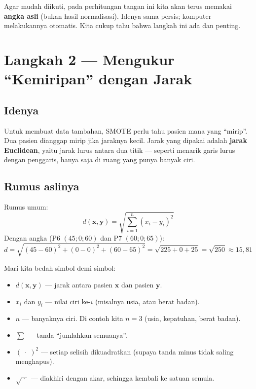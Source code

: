 \documentclass[11pt,a4paper]{article}
\begin{document}
\begin{catatan}
Agar mudah diikuti, pada perhitungan tangan ini kita akan terus memakai \textbf{angka asli}
(bukan hasil normalisasi). Idenya sama persis; komputer melakukannya otomatis. Kita cukup tahu
bahwa langkah ini ada dan penting.
\end{catatan}

\section{Langkah 2 --- Mengukur ``Kemiripan'' dengan Jarak}

\subsection{Idenya}

Untuk membuat data tambahan, SMOTE perlu tahu pasien mana yang ``mirip''. Dua pasien dianggap
mirip jika jaraknya kecil. Jarak yang dipakai adalah \textbf{jarak Euclidean}, yaitu jarak
lurus antara dua titik --- seperti menarik garis lurus dengan penggaris, hanya saja di ruang
yang punya banyak ciri.

\subsection{Rumus aslinya}

\begin{rumus}
Rumus umum:
\[ d(\mathbf{x}, \mathbf{y}) = \sqrt{\sum_{i=1}^{n} (x_i - y_i)^2} \]
Dengan angka (P6 $(45;0;60)$ dan P7 $(60;0;65)$):
\[ d = \sqrt{(45-60)^2 + (0-0)^2 + (60-65)^2} = \sqrt{225 + 0 + 25} = \sqrt{250} \approx 15{,}81 \]
\end{rumus}

\noindent Mari kita bedah simbol demi simbol:
\begin{itemize}[leftmargin=*]
  \item $d(\mathbf{x},\mathbf{y})$ --- jarak antara pasien $\mathbf{x}$ dan pasien $\mathbf{y}$.
  \item $x_i$ dan $y_i$ --- nilai ciri ke-$i$ (misalnya usia, atau berat badan).
  \item $n$ --- banyaknya ciri. Di contoh kita $n = 3$ (usia, kepatuhan, berat badan).
  \item $\sum$ --- tanda ``jumlahkan semuanya''.
  \item $(\;\cdot\;)^2$ --- setiap selisih dikuadratkan (supaya tanda minus tidak saling menghapus).
  \item $\sqrt{\;\cdot\;}$ --- diakhiri dengan akar, sehingga kembali ke satuan semula.
\end{itemize}
\end{document}
